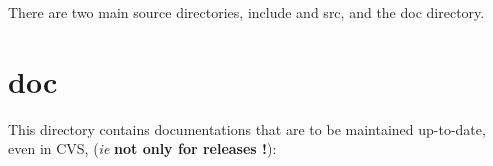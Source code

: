 

There are two main source directories, \textsf{include} and \textsf{src}, and
the \textsf{doc} directory.


\section{\textsf{doc}}
\label{s:doc}

This directory contains documentations that are to be maintained up-to-date,
even in CVS, (\emph{ie} \textbf{not only for releases !}):

